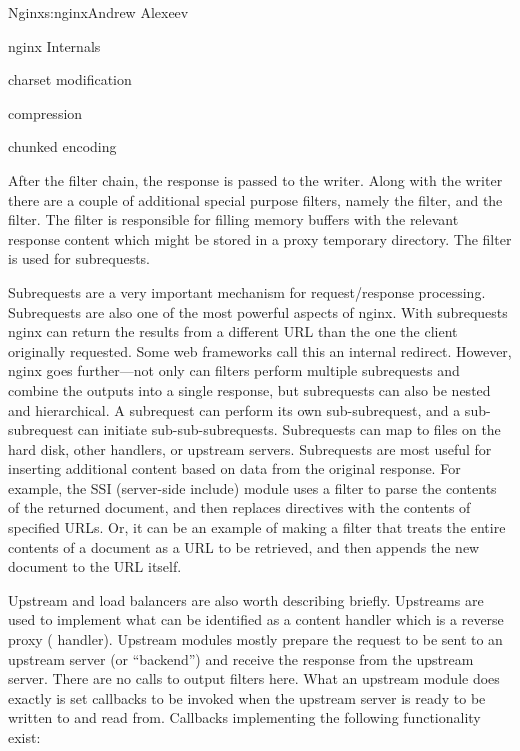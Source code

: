 \begin{aosachapter}{Nginx}{s:nginx}{Andrew Alexeev}
\begin{aosasect1}{nginx Internals}
\begin{aosaitemize}
\item charset modification

\item {} compression

\item chunked encoding

\end{aosaitemize}

After the filter chain, the response is passed to the writer. Along
with the writer there are a couple of additional special purpose
filters, namely the  filter, and the 
filter. The  filter is responsible for filling memory
buffers with the relevant response content which might be stored in a
proxy temporary directory. The  filter is used for
subrequests.

Subrequests are a very important mechanism for request/response
processing. Subrequests are also one of the most powerful aspects of
nginx. With subrequests nginx can return the results from a different
URL than the one the client originally requested. Some web frameworks
call this an internal redirect. However, nginx goes further---not only
can filters perform multiple subrequests and combine the outputs into
a single response, but subrequests can also be nested and
hierarchical. A subrequest can perform its own sub-subrequest, and a
sub-subrequest can initiate sub-sub-subrequests. Subrequests can map
to files on the hard disk, other handlers, or upstream
servers. Subrequests are most useful for inserting additional content
based on data from the original response. For example, the SSI
(server-side include) module uses a filter to parse the contents of
the returned document, and then replaces  directives
with the contents of specified URLs. Or, it can be an example of making
a filter that treats the entire contents of a document as a URL to be
retrieved, and then appends the new document to the URL itself.


Upstream and load balancers are also worth describing
briefly. Upstreams are used to implement what can be identified as a
content handler which is a reverse proxy (
handler). %
Upstream modules mostly prepare the request to be sent to an upstream
server (or ``backend'') and receive the response from the upstream
server. There are no calls to output filters here. What an upstream
module does exactly is set callbacks to be invoked when the upstream
server is ready to be written to and read from. Callbacks implementing
the following functionality exist:


\end{aosasect1}
\end{aosachapter}
